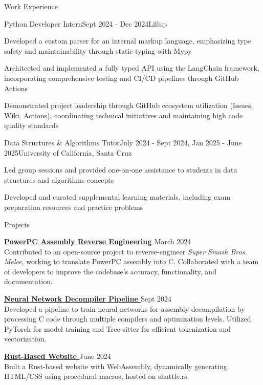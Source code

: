 \documentclass{resume}
\newcommand{\scaledfaExternalLink}{\raisebox{0.1\height}{\scalebox{0.7}{\faExternalLink*}}}
\begin{document}
\begin{rSection}{Work Experience}

  \begin{rSubsection}{Python Developer Intern}{Sept 2024 - Dec 2024}{Lillup}{}
  \item{} Developed a custom parser for an internal markup language,
    emphasizing type safety and maintainability through static typing with Mypy
  \item{} Architected and implemented a fully typed API using the
    LangChain framework, incorporating comprehensive testing and
    CI/CD pipelines through GitHub Actions
  \item{} Demonstrated project leadership through GitHub ecosystem
    utilization (Issues, Wiki, Actions), coordinating technical
    initiatives and maintaining high code quality standards
  \end{rSubsection}

  \begin{rSubsection}{Data Structures \& Algorithms Tutor}{July 2024
    - Sept 2024, Jan 2025 - June 2025}{University of California, Santa Cruz}{}
  \item{} Led group sessions and provided one-on-one assistance to
    students in data structures and algorithms concepts
  \item{} Developed and curated supplemental learning materials,
    including exam preparation resources and practice problems
  \end{rSubsection}

\end{rSection}

\begin{rSection}{Projects}

\item{} {\bf{}
    \href{https://github.com/search?q=repo\%3Adoldecomp\%2Fmelee++author\%3Awyatt-avilla&type=pullrequests&ref=advsearch}{PowerPC
  Assembly Reverse Engineering \scaledfaExternalLink}} {\hfill{} March 2024} \\
  Contributed to an open-source project to reverse-engineer
  \textit{Super Smash Bros. Melee}, working to translate PowerPC
  assembly into C. Collaborated with a team of developers to improve
  the codebase's accuracy, functionality, and documentation.

\item{} {\bf{} \href{https://github.com/wyatt-avilla/sunbird}{Neural
  Network Decompiler Pipeline \scaledfaExternalLink}} {\hfill{} Sept 2024} \\
  Developed a pipeline to train neural networks for assembly
  decompilation by processing C code through multiple compilers and
  optimization levels. Utilized PyTorch for model training and
  Tree-sitter for efficient tokenization and vectorization.

\item{} {\bf{} \href{https://github.com/wyatt-avilla/feframe}{Rust-Based
  Website \scaledfaExternalLink}} {\hfill{} June 2024} \\
  Built a Rust-based website with WebAssembly, dynamically generating
  HTML/CSS using procedural macros, hosted on shuttle.rs.

\end{rSection}
\end{document}

